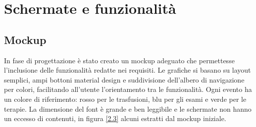 \documentclass[12pt,a4paper,openright,twoside]{report}
\begin{document}
\section{Schermate e funzionalità}
\subsection{Mockup}
In fase di progettazione è stato creato un mockup adeguato che permettesse l'inclusione delle funzionalità redatte nei requisiti. Le grafiche si basano su layout semplici, ampi bottoni material design e suddivisione dell’albero di navigazione per colori, facilitando all’utente l’orientamento tra le funzionalità. Ogni evento ha un colore di riferimento: rosso per le trasfusioni, blu per gli esami e verde per le terapie. La dimensione del font è grande e ben leggibile e le schermate non hanno un eccesso di contenuti, in figura \ref{2.3} alcuni estratti dal mockup iniziale.
\end{document}
